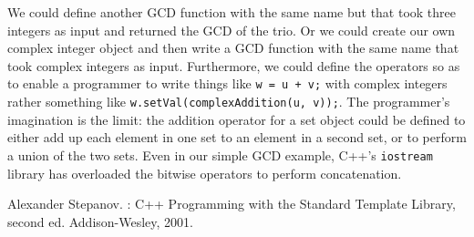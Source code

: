 \documentclass[12pt]{article}
\begin{document}
We could define another GCD function with the same name but that took three integers as input and returned the GCD of the trio. Or we could create our own complex integer object and then write a GCD function with the same name that took complex integers as input. Furthermore, we could define the operators so as to enable a programmer to write things like \verb-w = u + v;- with complex integers rather something like \verb-w.setVal(complexAddition(u, v));-. The programmer's imagination is the limit: the addition operator for a set object could be defined to either add up each element in one set to an element in a second set, or to perform a union of the two sets. Even in our simple GCD example, C++'s \verb=iostream= library has overloaded the bitwise operators to perform concatenation.

\begin{thebibliography}{XXXXX}
Alexander Stepanov. : C++ Programming with the Standard Template Library, second ed. Addison-Wesley, 2001. 
\end{thebibliography}

\end{document}
